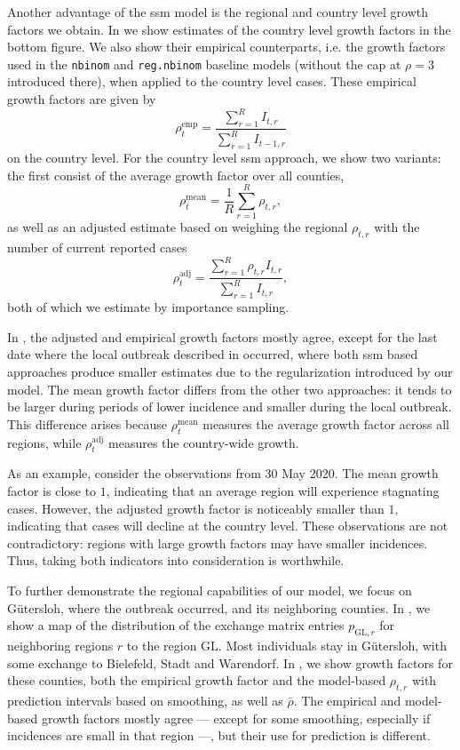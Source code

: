 Another advantage of the \gls{ssm} model is the regional and country level growth factors we obtain. In   we show estimates of the country  level growth factors in the bottom figure. We also show their empirical counterparts, i.e. the growth factors used in the \texttt{nbinom} and \texttt{reg.nbinom} baseline models (without the cap at $\rho = 3$ introduced there), when applied to the country level cases. These empirical growth factors are given by
$$
\rho_{t}^{\text{emp}} = \frac{\sum_{r = 1}^R I_{t, r}}{\sum_{r = 1}^{R} I_{t - 1, r}}
$$
on the country level.
For the country level \gls{ssm} approach, we show two variants: the first consist of the average growth factor over all counties, 
$$
    \rho_{t}^{\text{mean}} = \frac{1}{R} \sum_{r = 1}^R \rho_{t,r},
$$
as well as an adjusted estimate based on weighing the regional $\rho_{t,r}$ with the number of current reported cases
$$
    \rho_{t}^{\text{adj}} = \frac{\sum_{r = 1}^R\rho_{t,r} I_{t,r}}{\sum_{r = 1}^R I_{t, r}},
$$
both of which we estimate by importance sampling. 

In , the adjusted and empirical growth factors mostly agree, except for the last date where the local outbreak described in \citep{Gunther2020SARSCoV2} occurred, where both \gls{ssm} based approaches produce smaller estimates due to the regularization introduced by our model. The mean growth factor differs from the other two approaches: it tends to be larger during periods of lower incidence and smaller during the local outbreak. This difference arises because $\rho_{t}^{\text{mean}}$ measures the average growth factor across all regions, while $\rho_{t}^{\text{adj}}$ measures the country-wide growth. 

As an example, consider the observations from 30 May 2020. The mean growth factor is close to $1$, indicating that an \glqq{}average\grqq{} region will experience stagnating cases. However, the adjusted growth factor is noticeably smaller than $1$, indicating that cases will decline at the country level. These observations are not contradictory: regions with large growth factors may have smaller incidences. Thus, taking both indicators into consideration is worthwhile.




To further demonstrate the regional capabilities of our model, we focus on Gütersloh, where the outbreak occurred, and its neighboring counties. In , we show a map of the distribution of the exchange matrix entries $p_{\text{GL}, r}$ for neighboring regions $r$ to the region $\text{GL}$. Most individuals stay in Gütersloh, with some exchange to Bielefeld, Stadt and Warendorf. In , we show growth factors for these counties, both the empirical growth factor and the model-based $\rho_{t,r}$ with prediction intervals based on smoothing, as well as $\bar\rho$. The empirical and model-based growth factors mostly agree --- except for some smoothing, especially if incidences are small in that region ---, but their use for prediction is different. 

